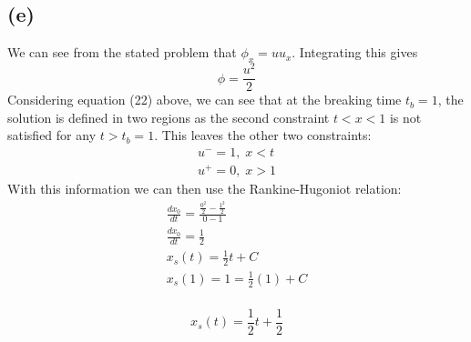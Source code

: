 \documentclass{article}
\begin{document}
\subsection*{(e)}
We can see from the stated problem that $\phi_x = uu_x$. Integrating this gives
\begin{equation}
\phi = \frac{u^2}{2}
\end{equation}
Considering equation (22) above, we can see that at the breaking time $t_b = 1$, the solution is defined in two regions as the second constraint $t < x < 1$ is not satisfied for any $t > t_b = 1$. This leaves the other two constraints:
\begin{equation}
\begin{aligned}
u^- = 1, \; x < t\\
u^+ = 0, \; x > 1
\end{aligned}
\end{equation}
With this information we can then use the Rankine-Hugoniot relation:
\begin{equation}
\begin{aligned}
\frac{dx_0}{dt} = \frac{\frac{0^2}{2} - \frac{1^2}{2}}{0 - 1}\\
\frac{dx_0}{dt} = \frac{1}{2}\\
x_s(t) = \frac{1}{2}t + C\\
x_s(1) = 1  = \frac{1}{2}(1) + C\\
\end{aligned}
\end{equation}
\begin{tcolorbox}[minipage,colback=white,arc=0pt,outer arc=0pt]
\begin{equation}
x_s(t) = \frac{1}{2}t + \frac{1}{2}
\end{equation}
\end{tcolorbox}
\end{document}
